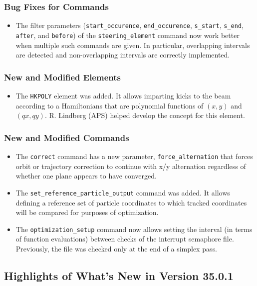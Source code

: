 \documentclass[11pt]{article}
\begin{document}
\subsubsection{Bug Fixes for Commands}
\begin{itemize}
\item The filter parameters (\verb|start_occurence|, \verb|end_occurence|, \verb|s_start|, \verb|s_end|, 
  \verb|after|, and \verb|before|)  of the \verb|steering_element| command now work better when multiple
  such commands are given. In particular, overlapping intervals are detected and non-overlapping intervals
  are correctly implemented.
\end{itemize}

\subsubsection{New and Modified Elements}
\begin{itemize}
\item The \verb|HKPOLY| element was added. It allows imparting kicks to the beam according to 
  a Hamiltonians that are polynomial functions of $(x, y)$ and $(qx, qy)$. R. Lindberg (APS) helped develop the
  concept for this element.
\end{itemize}

\subsubsection{New and Modified Commands}
\begin{itemize}
\item The \verb|correct| command has a new parameter, \verb|force_alternation| that forces orbit or trajectory correction
  to continue with x/y alternation regardless of whether one plane appears to have converged.
\item The \verb|set_reference_particle_output| command was added. It allows defining a reference set of particle coordinates
  to which tracked coordinates will be compared for purposes of optimization.
\item The \verb|optimization_setup| command now allows setting the interval (in terms of function evaluations) 
  between checks of the interrupt semaphore file. Previously, the file was checked only at the end of a simplex pass.
\end{itemize}

\subsection{Highlights of What's New in Version 35.0.1}
\end{document}
